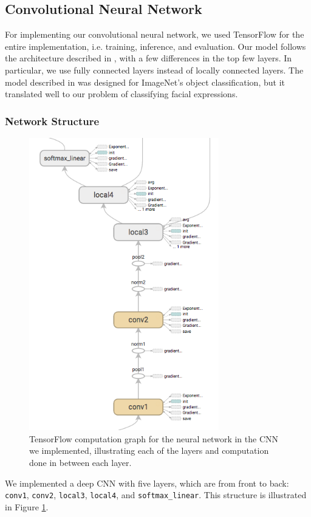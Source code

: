 \documentclass[11pt, twocolumn, twoside]{article}
\begin{document}
\subsection{Convolutional Neural Network}

For implementing our convolutional neural network, we used TensorFlow for the entire implementation, i.e. training, inference, and evaluation. Our model follows the architecture described in \cite{Krizhevsky}, with a few differences in the top few layers. In particular, we use fully connected layers instead of locally connected layers. The model described in \cite{Krizhevsky} was designed for ImageNet's object classification, but it translated well to our problem of classifying facial expressions.

\subsubsection{Network Structure}

\begin{figure}
	\centering
	\includegraphics[width=3.25in]{inference_graph}
	\caption{TensorFlow computation graph for the neural network in the CNN we implemented, illustrating each of the layers and computation done in between each layer.}
	\label{fig:inference}
\end{figure}

We implemented a deep CNN with five layers, which are from front to back: \texttt{conv1}, \texttt{conv2}, \texttt{local3}, \texttt{local4}, and \texttt{softmax\_linear}. This structure is illustrated in Figure \ref{fig:inference}. 
\end{document}
